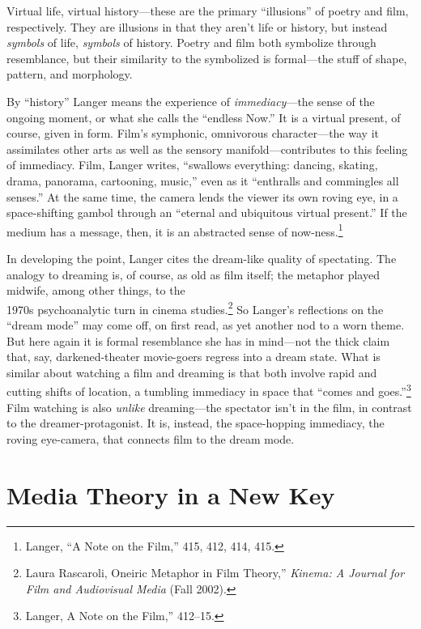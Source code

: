 \documentclass{tufte-handout}
\begin{document}
Virtual life, virtual history---these are the primary ``illusions'' of
poetry and film, respectively. They are illusions in that they aren't
life or history, but instead \emph{symbols} of life, \emph{symbols} of
history. Poetry and film both symbolize through resemblance, but their
similarity to the symbolized is formal---the stuff of shape, pattern,
and morphology.

By ``history'' Langer means the experience of \emph{immediacy}---the
sense of the ongoing moment, or what she calls the ``endless Now.'' It
is a virtual present, of course, given in form. Film's symphonic,
omnivorous character---the way it assimilates other arts as well as the
sensory manifold---contributes to this feeling of immediacy. Film,
Langer writes, ``swallows everything: dancing, skating, drama, panorama,
cartooning, music,'' even as it ``enthralls and commingles all senses.''
At the same time, the camera lends the viewer its own roving eye, in a
space-shifting gambol through an ``eternal and ubiquitous virtual
present.'' If the medium has a message, then, it is an abstracted sense
of now-ness.\footnote{Langer, ``A Note on the Film,'' 415, 412,
  414, 415.}

In developing the point, Langer cites the dream-like quality of
spectating. The analogy to dreaming is, of course, as old as film
itself; the metaphor played midwife, among other things, to the\\\noindent 1970s
psychoanalytic turn in cinema studies.\footnote{Laura Rascaroli,
  Oneiric Metaphor in Film Theory,'' \emph{Kinema: A Journal for
  Film and Audiovisual Media} (Fall 2002).} So Langer's reflections on
the ``dream mode'' may come off, on first read, as yet another nod to a
worn theme. But here again it is formal resemblance she has in
mind---not the thick claim that, say, darkened-theater movie-goers
regress into a dream state. What is similar about watching a film and
dreaming is that both involve rapid and cutting shifts of location, a
tumbling immediacy in space that ``comes and goes.''\footnote{Langer,
  A Note on the Film,'' 412--15.} Film watching is also
\emph{unlike} dreaming---the spectator isn't in the film, in contrast to
the dreamer-protagonist. It is, instead, the space-hopping immediacy,
the roving eye-camera, that connects film to the dream mode.

\hypertarget{media-theory-in-a-new-key}{%
\section{Media Theory in a New Key}\label{media-theory-in-a-new-key}}
\end{document}
